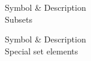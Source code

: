 {  %
} {
  Symbol & Description \\
} {
  Subsets
} {
  \label{tbl:subsets}
}

 {
  Symbol & Description \\
} {
  Special set elements
} {
  \label{tbl:elements}
}

